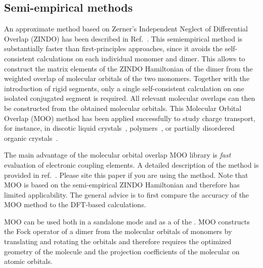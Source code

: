 \subsection{Semi-empirical methods}
\label{sec:moo}

\newcommand{\moo}{MOO\xspace}

An approximate method based on Zerner's Independent Neglect of Differential Overlap (ZINDO) has been described in Ref.~\cite{kirkpatrick_approximate_2008}. This semiempirical method is substantially faster than first-principles approaches, since it avoids the self-consistent calculations on each individual monomer and dimer. This allows to construct the matrix elements of the ZINDO Hamiltonian of the dimer from the weighted overlap of molecular orbitals of the two monomers. Together with the introduction of rigid segments, only a single self-consistent calculation on one isolated conjugated segment is required. All relevant molecular overlaps can then be constructed from the obtained molecular orbitals. This Molecular Orbital Overlap (MOO) method has been applied successfully to study charge transport, for instance, in discotic liquid crystals~\cite{kirkpatrick_columnar_2008,marcon_understanding_2009,feng_towards_2009},
polymers~\cite{ruehle_multiscale_2010}, or partially disordered organic crystals~\cite{vehoff_charge_2010-1,vehoff_charge_2010-2,vehoff_charge_2010}.

The main advantage of the molecular orbital overlap \moo library is {\em fast} evaluation of electronic coupling elements. A detailed description of the method is provided in ref.~\cite{kirkpatrick_approximate_2008}. Please site this paper if you are using the method. Note that \moo is based on the semi-empirical ZINDO Hamiltonian and therefore has limited applicability. The general advice is to first compare the accuracy of the \moo method to the DFT-based calculations. 

\moo can be used both in a sandalone mode and as a \calculator of the \votcactp. \moo constructs the Fock operator of a dimer from the  molecular orbitals of monomers by translating and rotating the orbitals and therefore requires the optimized geometry of the molecule and the projection coefficients of the molecular on atomic orbitals. 


